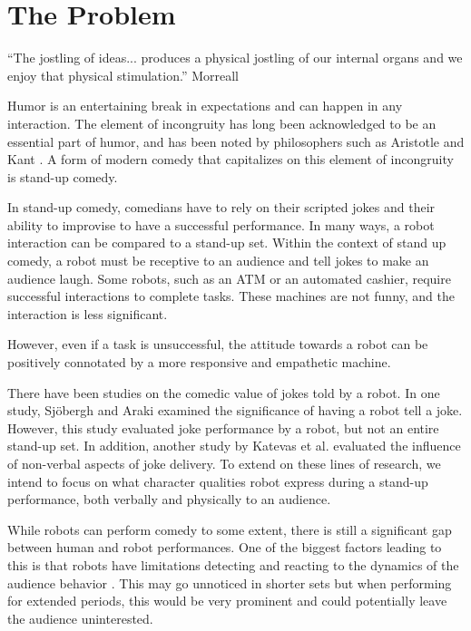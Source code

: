 \documentclass[onecolumn, draftclsnofoot,10pt, compsoc]{IEEEtran}
\begin{document}
\section{The Problem}

“The jostling of ideas... produces a physical jostling of our internal organs and we enjoy that physical stimulation.”  {Morreall}

Humor is an entertaining break in expectations and can happen in any interaction. The element of incongruity has long been acknowledged to be an essential part of humor, and has been noted by philosophers such as Aristotle and Kant {\cite{StanfordHum:2016}}. A form of modern comedy that capitalizes on this element of incongruity is stand-up comedy.

In stand-up comedy, comedians have to rely on their scripted jokes and their ability to improvise to have a successful performance. In many ways, a robot interaction can be compared to a stand-up set. Within the context of stand up comedy, a robot must be receptive to an audience and tell jokes to make an audience laugh. Some robots, such as an ATM or an automated cashier, require successful interactions to complete tasks. These machines are not funny, and the interaction is less significant.

However, even if a task is unsuccessful, the attitude towards a robot can be positively connotated by a more responsive and empathetic machine. {\cite{DesignExBeh:2017}}

There have been studies on the comedic value of jokes told by a robot. In one study, Sjöbergh and Araki {\cite{RobotsMakeThings:2008}} examined the significance of having a robot tell a joke. However, this study evaluated joke performance by a robot, but not an entire stand-up set. In addition, another study by Katevas et al. {\cite{RobotComedyLab:2015}} evaluated the influence of non-verbal aspects of joke delivery. To extend on these lines of research, we intend to focus on what character qualities robot express during a stand-up performance, both verbally and physically to an audience.

While robots can perform comedy to some extent, there is still a significant gap between human and robot performances. One of the biggest factors leading to this is that robots have limitations detecting and reacting to the dynamics of the audience behavior {\cite{KatevasRobot:2014}}. This may go unnoticed in shorter sets but when performing for extended periods, this would be very prominent and could potentially leave the audience uninterested.
\end{document}
